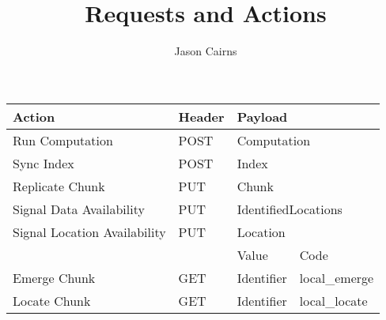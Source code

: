 \documentclass[a4paper, 10pt]{article}
\begin{document}
\title{Requests and Actions}
\author{Jason Cairns}
  
\maketitle

\begin{table}[h!]
	\begin{tabular}{llll}
		\hline
		Action                       & Header & \multicolumn{2}{l}{Payload}             \\ \hline
		Run Computation              & POST   & \multicolumn{2}{l}{Computation}         \\
		Sync Index                   & POST   & \multicolumn{2}{l}{Index}               \\
		Replicate Chunk              & PUT    & \multicolumn{2}{l}{Chunk}               \\
		Signal Data Availability     & PUT    & \multicolumn{2}{l}{IdentifiedLocations} \\
		Signal Location Availability & PUT    & \multicolumn{2}{l}{Location}            \\
					     &        & Value             & Code                \\ \cline{3-4} 
		Emerge  Chunk                & GET    & Identifier        & local\_emerge       \\
		Locate Chunk                 & GET    & Identifier        & local\_locate      
	\end{tabular}
\end{table}
\end{document}
